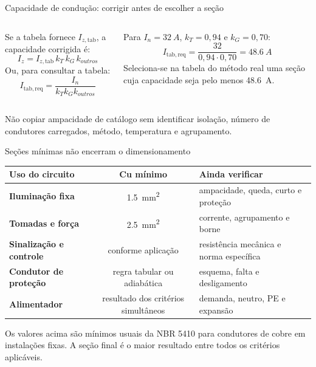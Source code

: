 \begin{frame}{Capacidade de condução: corrigir antes de escolher a seção}
\small
\begin{columns}[T,onlytextwidth]
Se a tabela fornece $I_{z,\mathrm{tab}}$, a capacidade corrigida é:
\[
I_z=I_{z,\mathrm{tab}}\,k_T\,k_G\,k_{outros}
\]
Ou, para consultar a tabela:
\[
I_{\mathrm{tab,req}}=\frac{I_n}{k_Tk_Gk_{outros}}
\]
\begin{caixaEx}[title=Três circuitos agrupados]
Para $I_n=\SI{32}{A}$, $k_T=0{,}94$ e $k_G=0{,}70$:
\[
I_{\mathrm{tab,req}}=\frac{32}{0{,}94\cdot0{,}70}
=\SI{48.6}{A}
\]
Seleciona-se na tabela do método real uma seção cuja capacidade seja pelo menos \SI{48.6}{A}.
\end{caixaEx}
\end{columns}
\begin{caixaAt}
Não copiar ampacidade de catálogo sem identificar isolação, número de condutores carregados, método, temperatura e agrupamento.
\end{caixaAt}
\end{frame}

\begin{frame}[shrink=4]{Seções mínimas não encerram o dimensionamento}
\small
\begin{tabularx}{\textwidth}{>{\bfseries}p{3.6cm}c X}
\toprule
Uso do circuito & Cu mínimo & Ainda verificar \\
\midrule
Iluminação fixa & \SI{1.5}{mm^2} & ampacidade, queda, curto e proteção \\
Tomadas e força & \SI{2.5}{mm^2} & corrente, agrupamento e borne \\
Sinalização e controle & conforme aplicação & resistência mecânica e norma específica \\
Condutor de proteção & regra tabular ou adiabática & esquema, falta e desligamento \\
Alimentador & resultado dos critérios simultâneos & demanda, neutro, PE e expansão \\
\bottomrule
\end{tabularx}
\vspace{2mm}
\begin{caixaNorma}
Os valores acima são mínimos usuais da NBR 5410 para condutores de cobre em instalações fixas. A seção final é o maior resultado entre todos os critérios aplicáveis.
\end{caixaNorma}
\end{frame}

